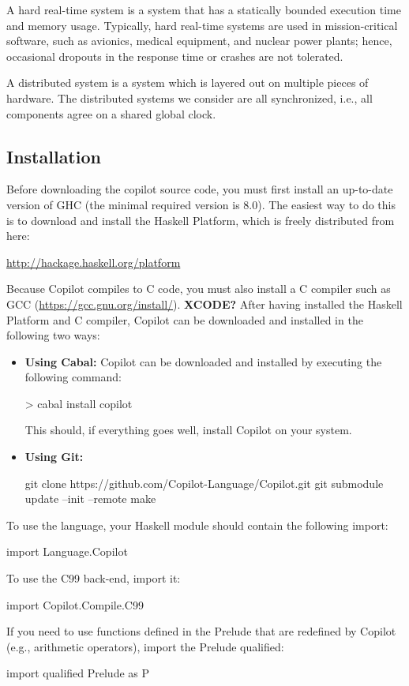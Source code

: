 A hard real-time system is a system that has a statically bounded execution time
and memory usage.  Typically, hard real-time systems are used in
mission-critical software, such as avionics, medical equipment, and nuclear power
plants; hence, occasional dropouts in the response time or crashes are not
tolerated.

A distributed system is a system which is layered out on multiple pieces of hardware.
The distributed systems we consider are all synchronized, i.e., all components agree on
a shared global clock.


\subsection{Installation} \label{sec:install}

Before downloading the copilot source code, you must first install an
up-to-date version of GHC (the minimal required version is 8.0).
The easiest way to do this is to download and install the Haskell Platform,
which is freely distributed from here:

\begin{center}
\url{http://hackage.haskell.org/platform}
\end{center}

\noindent Because Copilot compiles to C code, you must also install a C compiler such as GCC (\url{https://gcc.gnu.org/install/}).  \textbf{XCODE?} After having installed the Haskell Platform and C compiler, Copilot can be downloaded and
installed in the following two ways:

\begin{itemize}
\item \textbf{Using Cabal: } Copilot can be downloaded and installed by executing the following command:

\begin{code}
> cabal install copilot
\end{code}

\noindent This should, if everything goes well, install Copilot on your system.

\item \textbf{Using Git: }

\begin{code}
     git clone https://github.com/Copilot-Language/Copilot.git
     git submodule update --init --remote
     make
\end{code}
\end{itemize}

\noindent To use the language, your Haskell module should contain the following import:
%
\begin{code}
import Language.Copilot
\end{code}
%
To use the C99 back-end, import it:
%
\begin{code}
import Copilot.Compile.C99
\end{code}
%
If you need to use functions defined in the Prelude that are redefined by
Copilot (e.g., arithmetic operators), import the Prelude qualified:
%
\begin{code}
import qualified Prelude as P
\end{code}

